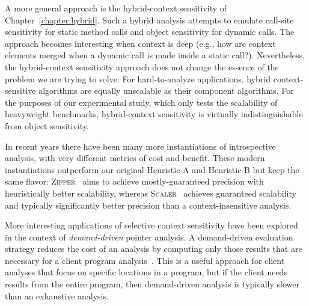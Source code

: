 A more general approach is the hybrid-context sensitivity of Chapter~\ref{chapter:hybrid}. Such a hybrid analysis attempts to emulate call-site sensitivity for static method calls and object sensitivity for dynamic calls. The approach becomes interesting when context is deep (e.g., how are context elements merged when a dynamic call is made inside a static call?). Nevertheless, the hybrid-context sensitivity approach does not change the essence of the problem we are trying to solve. For hard-to-analyze applications, hybrid context-sensitive algorithms are equally unscalable as their component algorithms. For the purposes of our experimental study, which only tests the scalability of heavyweight benchmarks, hybrid-context sensitivity is virtually indistinguishable from object sensitivity.

In recent years there have been many more instantiations of introspective analysis, with very different metrics of cost and benefit. These modern instantiations outperform our original Heuristic-A and Heuristic-B but keep the same flavor: \textsc{Zipper}~\cite{oopsla:2018:Li} aims to achieve mostly-guaranteed precision with heuristically better scalability, whereas \textsc{Scaler}~\cite{esec-fse:2018:Li} achieves guaranteed scalability and typically significantly better precision than a context-insensitive analysis.

More interesting applications of selective context sensitivity have been explored in the context of \emph{demand-driven} pointer analysis. A demand-driven evaluation strategy reduces the cost of an analysis by computing only those results that are necessary for a client program analysis~\cite{oopsla:2005:Sridharan,pldi:2006:Sridharan,popl:2008:Zheng,pldi:2001:Heintze}. This is a useful approach for client analyses that focus on specific locations in a program, but if the client needs results from the entire program, then demand-driven analysis is typically slower than an exhaustive analysis.

